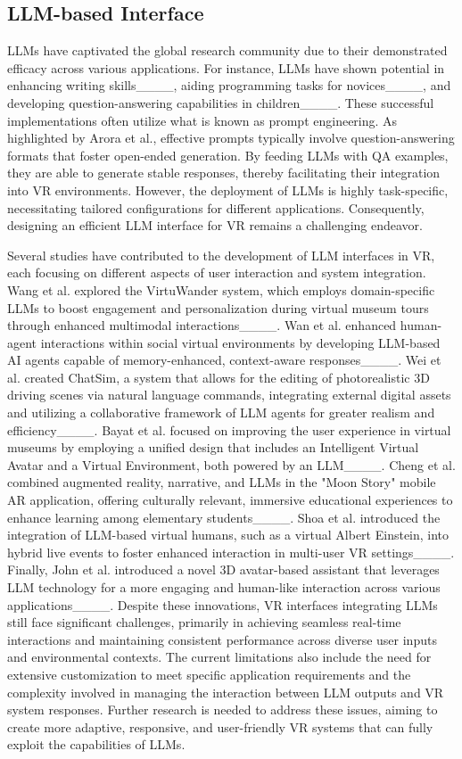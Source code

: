 \subsection{LLM-based Interface}
LLMs have captivated the global research community due to their demonstrated efficacy across various applications. For instance, LLMs have shown potential in enhancing writing skills____, aiding programming tasks for novices____, and developing question-answering capabilities in children____. These successful implementations often utilize what is known as prompt engineering. As highlighted by Arora et al., effective prompts typically involve question-answering formats that foster open-ended generation. By feeding LLMs with QA examples, they are able to generate stable responses, thereby facilitating their integration into VR environments. However, the deployment of LLMs is highly task-specific, necessitating tailored configurations for different applications. Consequently, designing an efficient LLM interface for VR remains a challenging endeavor.

Several studies have contributed to the development of LLM interfaces in VR, each focusing on different aspects of user interaction and system integration. Wang et al. explored the VirtuWander system, which employs domain-specific LLMs to boost engagement and personalization during virtual museum tours through enhanced multimodal interactions____. Wan et al. enhanced human-agent interactions within social virtual environments by developing LLM-based AI agents capable of memory-enhanced, context-aware responses____. Wei et al. created ChatSim, a system that allows for the editing of photorealistic 3D driving scenes via natural language commands, integrating external digital assets and utilizing a collaborative framework of LLM agents for greater realism and efficiency____. Bayat et al. focused on improving the user experience in virtual museums by employing a unified design that includes an Intelligent Virtual Avatar and a Virtual Environment, both powered by an LLM____. Cheng et al. combined augmented reality, narrative, and LLMs in the "Moon Story" mobile AR application, offering culturally relevant, immersive educational experiences to enhance learning among elementary students____. Shoa et al. introduced the integration of LLM-based virtual humans, such as a virtual Albert Einstein, into hybrid live events to foster enhanced interaction in multi-user VR settings____. Finally, John et al. introduced a novel 3D avatar-based assistant that leverages LLM technology for a more engaging and human-like interaction across various applications____. Despite these innovations, VR interfaces integrating LLMs still face significant challenges, primarily in achieving seamless real-time interactions and maintaining consistent performance across diverse user inputs and environmental contexts. The current limitations also include the need for extensive customization to meet specific application requirements and the complexity involved in managing the interaction between LLM outputs and VR system responses. Further research is needed to address these issues, aiming to create more adaptive, responsive, and user-friendly VR systems that can fully exploit the capabilities of LLMs. 


